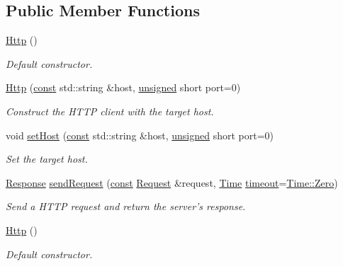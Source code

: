\subsection*{Public Member Functions}
\begin{DoxyCompactItemize}
\item 
\hyperlink{classsf_1_1_http_abe2360194f99bdde402c9f97a85cf067}{Http} ()
\begin{DoxyCompactList}\small\item\em Default constructor. \end{DoxyCompactList}\item 
\hyperlink{classsf_1_1_http_a79efd844a735f083fcce0edbf1092385}{Http} (\hyperlink{term__entry_8h_a57bd63ce7f9a353488880e3de6692d5a}{const} std\-::string \&host, \hyperlink{curses_8priv_8h_aca40206900cfc164654362fa8d4ad1e6}{unsigned} short port=0)
\begin{DoxyCompactList}\small\item\em Construct the H\-T\-T\-P client with the target host. \end{DoxyCompactList}\item 
void \hyperlink{classsf_1_1_http_a55121d543b61c41cf20b885a97b04e65}{set\-Host} (\hyperlink{term__entry_8h_a57bd63ce7f9a353488880e3de6692d5a}{const} std\-::string \&host, \hyperlink{curses_8priv_8h_aca40206900cfc164654362fa8d4ad1e6}{unsigned} short port=0)
\begin{DoxyCompactList}\small\item\em Set the target host. \end{DoxyCompactList}\item 
\hyperlink{classsf_1_1_http_1_1_response}{Response} \hyperlink{classsf_1_1_http_aaf09ebfb5e00dcc82e0d494d5c6a9e2a}{send\-Request} (\hyperlink{term__entry_8h_a57bd63ce7f9a353488880e3de6692d5a}{const} \hyperlink{classsf_1_1_http_1_1_request}{Request} \&request, \hyperlink{classsf_1_1_time}{Time} \hyperlink{_ndk_8cpp_a174cf046f3b5dbb1258515b3f138b8c7}{timeout}=\hyperlink{classsf_1_1_time_aa343e67f43a940e7b3b51aa10a495f2f}{Time\-::\-Zero})
\begin{DoxyCompactList}\small\item\em Send a H\-T\-T\-P request and return the server's response. \end{DoxyCompactList}\item 
\hyperlink{classsf_1_1_http_abe2360194f99bdde402c9f97a85cf067}{Http} ()
\begin{DoxyCompactList}\small\item\em Default constructor. \end{DoxyCompactList}\item 

\end{DoxyCompactItemize}
